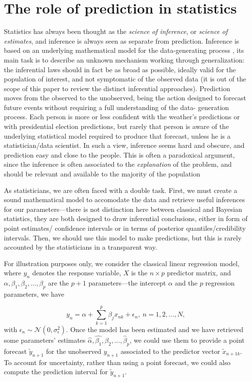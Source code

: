 \documentclass{statsoc}
\begin{document}
\section{The role of prediction in statistics}

Statistics has always been thought as the \emph{science of inference}, or \emph{science of estimates}, and inference is always seen as separate from prediction. Inference is based on 
an underlying mathematical model for the data-generating process \citep{bzdok2018points}, its main task is to describe an unknown mechanism working through generalization: the 
inferential laws should in fact be as broad as possible, ideally valid for the population of interest, and not symptomatic of the observed data (it is out of the scope of this paper to review the distinct inferential 
approaches). Prediction moves from the observed to the unobserved, being the action designed to forecast future events without requiring a full understanding of the data-
generation process. Each person is more or less confident with the weather's predictions or with presidential election predictions, but rarely that person is aware of the underlying 
statistical model required to produce that forecast, unless he is a statistician/data scientist. In such a view, inference seems hard and obscure, and prediction easy and close 
to the people. This is often a paradoxical argument, since the inference is often associated to the \emph{explanation} of the problem, and should be relevant and available to the majority of the population

As statisticians, we are often faced with a double task. First, we must create a sound mathematical model to accomodate the data and retrieve useful inferences for our 
parameters---there is not distinction here between classical and Bayesian statistics, they are both designed to draw inferential conclusions, either in form of point estimates/
confidence intervals or in terms of posterior quantiles/credibility intervals. Then, we should use this model to make predictions, but this is rarely accounted by the statisticians in a transparent way.

For illustration purposes only, we consider the classical linear regression model, where $y_n$ denotes the response variable, $X$ is the $n \times p$ predictor matrix, and $\alpha,\beta_1,\beta_2,\ldots,\beta_p$ are the $p+1$ parameters---the intercept $\alpha$ and the $p$ regression parameters, we have

\begin{equation}
y_n = \alpha + \sum_{k=1}^p \beta_j x_{nk} + \epsilon_n, \ n=1,2,\ldots,N,
\label{eq:linear}
\end{equation}
%
with $\epsilon_n \sim \mathcal{N}(0, \sigma^2_{\epsilon})$. Once the model has been estimated and we have retrieved some parameters' estimates $\hat{\alpha}, \hat{\beta_1}, \beta_{2},\ldots,\hat{\beta}_p$, we could use them to provide a point forecast $\tilde{y}_{n+1}$ for the unobserved ${y}_{n+1}$ associated to the predictor vector $\tilde{x}_{n+1k}$. To account for uncertainty, rather than using a point forecast, we could also compute the prediction interval for $\tilde{y}_{n+1}$.
\end{document}
